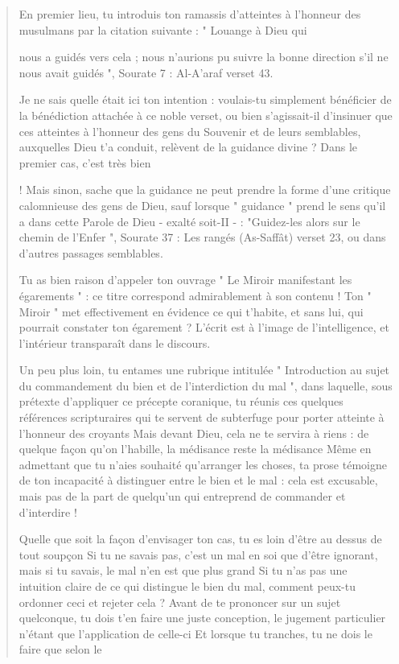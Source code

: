\begin{quote}
En premier lieu, tu introduis ton ramassis d'atteintes à l'honneur des
musulmans par la citation suivante : " Louange à Dieu qui

nous a guidés vers cela ; nous n'aurions pu suivre la bonne direction
s'il ne nous avait guidés ", Sourate 7 : Al-A'araf verset 43.

Je ne sais quelle était ici ton intention : voulais-tu simplement
bénéficier de la bénédiction attachée à ce noble verset, ou bien
s'agissait-il d'insinuer que ces atteintes à l'honneur des gens du
Souvenir et de leurs semblables, auxquelles Dieu t'a conduit, relèvent
de la guidance divine ? Dans le premier cas, c'est très bien

! Mais sinon, sache que la guidance ne peut prendre la forme d'une
critique calomnieuse des gens de Dieu, sauf lorsque " guidance " prend
le sens qu'il a dans cette Parole de Dieu - exalté soit-II - :
"Guidez-les alors sur le chemin de l'Enfer ", Sourate 37 : Les rangés
(As-Saffât) verset 23, ou dans d'autres passages semblables.

Tu as bien raison d'appeler ton ouvrage " Le Miroir manifestant les
égarements " : ce titre correspond admirablement à son contenu ! Ton "
Miroir " met effectivement en évidence ce qui t'habite, et sans lui, qui
pourrait constater ton égarement ? L'écrit est à l'image de
l'intelligence, et l'intérieur transparaît dans le discours.

Un peu plus loin, tu entames une rubrique intitulée " Introduction au
sujet du commandement du bien et de l'interdiction du mal ", dans
laquelle, sous prétexte d'appliquer ce précepte coranique, tu réunis ces
quelques références scripturaires qui te servent de subterfuge pour
porter atteinte à l'honneur des croyants Mais devant Dieu, cela ne te
servira à riens : de quelque façon qu'on l'habille, la médisance reste
la médisance Même en admettant que tu n'aies souhaité qu'arranger les
choses, ta prose témoigne de ton incapacité à distinguer entre le bien
et le mal : cela est excusable, mais pas de la part de quelqu'un qui
entreprend de commander et d'interdire !

Quelle que soit la façon d'envisager ton cas, tu es loin d'être au
dessus de tout soupçon Si tu ne savais pas, c'est un mal en soi que
d'être ignorant, mais si tu savais, le mal n'en est que plus grand Si tu
n'as pas une intuition claire de ce qui distingue le bien du mal,
comment peux-tu ordonner ceci et rejeter cela ? Avant de te prononcer
sur un sujet quelconque, tu dois t'en faire une juste conception, le
jugement particulier n'étant que l'application de celle-ci Et lorsque tu
tranches, tu ne dois le faire que selon le


\end{quote}
